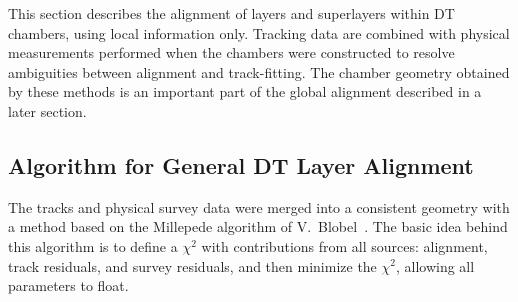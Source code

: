 This section describes the alignment of layers and superlayers within
DT chambers, using local information only.  Tracking data are combined
with physical measurements performed when the chambers were
constructed to resolve ambiguities between alignment and
track-fitting.  The chamber geometry obtained by these methods is an
important part of the global alignment described in a later section.

\subsection{Algorithm for General DT Layer Alignment}
\label{sec:standdt_general}

The tracks and physical survey data were merged into a consistent
geometry with a method based on the Millepede algorithm of
V.~Blobel~\cite{ref:Millepede}.  The basic idea behind this algorithm is
to define a $\chi^2$ with contributions from all sources: alignment,
track residuals, and survey residuals, and then minimize the $\chi^2$,
allowing all parameters to float.

